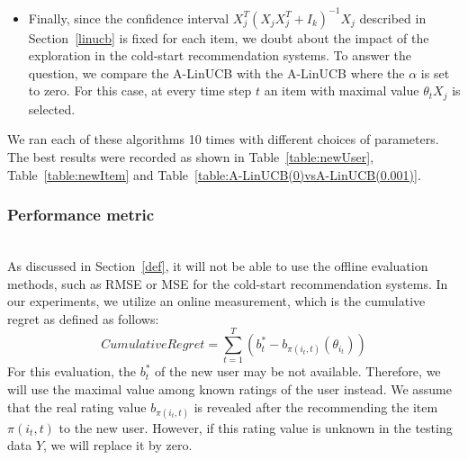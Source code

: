 \documentclass[twoside,leqno,twocolumn]{article}
\begin{document}
\begin{itemize}

\item Finally, since the confidence interval $X^{T}_{j}(X_{j}X^{T}_{j}+I_{k})^{-1}X_{j}$ described in Section~\ref{linucb} is fixed for each item, we doubt about the impact of the exploration in the cold-start recommendation systems. To answer the question, we compare the A-LinUCB with the A-LinUCB where the $\alpha$ is set to zero. For this case, at every time step $t$ an item with maximal value $\theta_{t}X_{j}$ is selected.

\end{itemize}

We ran each of these algorithms 10 times with different choices of parameters. The best results were recorded as shown in Table~\ref{table:newUser}, Table~\ref{table:newItem} and Table~\ref{table:A-LinUCB(0)vsA-LinUCB(0.001)}.


\subsubsection{Performance metric}
~\\
As discussed in Section~\ref{def}, it will not be able to use the offline evaluation methods, such as RMSE or MSE for the cold-start recommendation systems. In our experiments, we utilize an online measurement, which is the cumulative regret as defined as follows:
$$ 
  CumulativeRegret = \sum_{t=1}^{T}(b^{*}_{t}-b_{\pi(i_t,t)}(\theta_{i{_t}}))
$$
For this evaluation, the $b^{*}_{t}$ of the new user may be not available. Therefore, we will use the maximal value among known ratings of the user instead. We assume that the real rating value $b_{\pi(i_t,t)}$ is revealed after the recommending the item $\pi(i_t,t)$ to the new user. However, if this rating value is unknown in the testing data $Y$, we will replace it by zero. 
\end{document}
